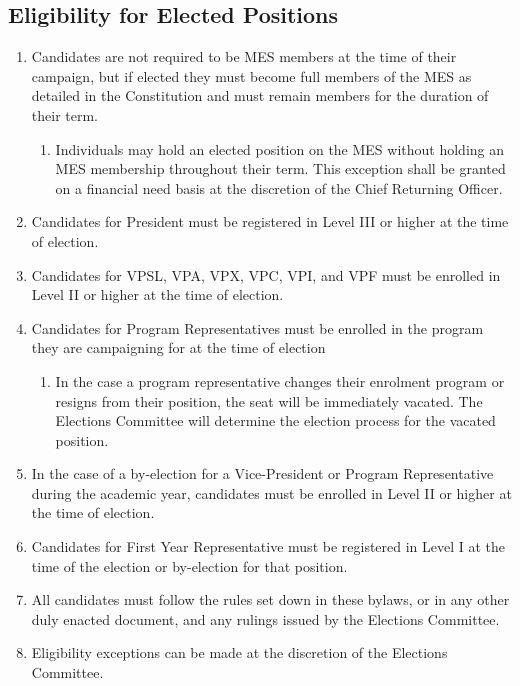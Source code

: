 \subsection{Eligibility for Elected Positions}
\label{eligibility-for-elected-positions}


\begin{enumerate}
 \item
  Candidates are not required to be MES members at the time of their
  campaign, but if elected they must become full members of the MES as
  detailed in the Constitution and must remain members for the duration
  of their term.

  \begin{enumerate}
   \item
    Individuals may hold an elected position on the MES without holding
    an MES membership throughout their term. This exception shall be
    granted on a financial need basis at the discretion of the Chief
    Returning Officer.
  \end{enumerate}
 \item
  Candidates for President must be registered in Level III or higher at
  the time of election.
 \item
  Candidates for VPSL, VPA, VPX, VPC, VPI, and VPF must be enrolled in
  Level II or higher at the time of election.
 \item
  Candidates for Program Representatives must be enrolled in the program
  they are campaigning for at the time of election

  \begin{enumerate}
   \item
    In the case a program representative changes their enrolment program
    or resigns from their position, the seat will be immediately
    vacated. The Elections Committee will determine the election process
    for the vacated position.
  \end{enumerate}
 \item
  In the case of a by-election for a Vice-President or Program
  Representative during the academic year, candidates must be enrolled
  in Level II or higher at the time of election.
 \item
  Candidates for First Year Representative must be registered in Level I
  at the time of the election or by-election for that position.
 \item
  All candidates must follow the rules set down in these bylaws, or in
  any other duly enacted document, and any rulings issued by the
  Elections Committee.
 \item
  Eligibility exceptions can be made at the discretion of the Elections
  Committee.
\end{enumerate}

